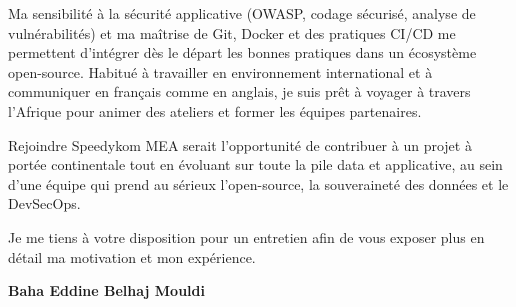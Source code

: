 \documentclass[a4paper,11pt]{article}
\begin{document}
Ma sensibilité à la sécurité applicative (OWASP, codage sécurisé, analyse de vulnérabilités) et ma maîtrise de Git, Docker et des pratiques CI/CD me permettent d'intégrer dès le départ les bonnes pratiques dans un écosystème open-source. Habitué à travailler en environnement international et à communiquer en français comme en anglais, je suis prêt à voyager à travers l'Afrique pour animer des ateliers et former les équipes partenaires.

Rejoindre Speedykom MEA serait l'opportunité de contribuer à un projet à portée continentale tout en évoluant sur toute la pile data et applicative, au sein d'une équipe qui prend au sérieux l'open-source, la souveraineté des données et le DevSecOps.

Je me tiens à votre disposition pour un entretien afin de vous exposer plus en détail ma motivation et mon expérience.

\vspace{0.8cm}

\begin{flushright}
{\bfseries Baha Eddine Belhaj Mouldi}
\end{flushright}
\end{document}
